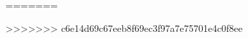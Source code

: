 \documentclass[11pt, oneside]{article}
\begin{document}
\begin{comment}
\bibitem{knittel}
Ge, Yanbo, et al. Racial and gender discrimination in transportation network companies. No. w22776. National Bureau of Economic Research, 2016.
\bibitem{edelman2}
Edelman, Benjamin G. and Luca, Michael and Svirsky, Dan, Racial Discrimination in the Sharing Economy: Evidence from a Field Experiment (September 16, 2016). Forthcoming, American Economic Journal: Applied Economics. Available at SSRN: https://ssrn.com/abstract=2701902 or http://dx.doi.org/10.2139/ssrn.2701902
\bibitem{insideairbnb}
Cox, Murray. ``Inside Airbnb. Adding Data to the Debate." Inside Airbnb. N.p., n.d. Web. 23 Apr. 2017.
\bibitem{firebaugh}
Firebaugh, Glenn, and Chad R. Farrell. ``Still large, but narrowing: The sizable decline in racial neighborhood inequality in metropolitan America, 1980?2010." Demography 53.1 (2016): 139-164.
\bibitem{logan}
Logan, John R. ``Separate and unequal: The neighborhood gap for blacks, Hispanics and Asians in Metropolitan America." Project US2010 Report (2011): 1-22.
\bibitem{census}
``U.S. Census Bureau Data". U.S. Census Bureau. 2010. Retrieved 2017-04-22.
\bibitem{hu}
Hu, Minqing, and Bing Liu. ``Mining and summarizing customer reviews." Proceedings of the tenth ACM SIGKDD international conference on Knowledge discovery and data mining. ACM, 2004.
\bibitem{fradkin}
Fradkin, Andrey, Elena Grewal, and David Holtz. The Determinants of Online Review Informativeness: Evidence from Field Experiments on Airbnb. Mimeo, 2017.
\end{thebibliography}


\end{comment}
=======

>>>>>>> c6e14d69c67eeb8f69ec3f97a7e75701e4c0f8ee
\end{document}
